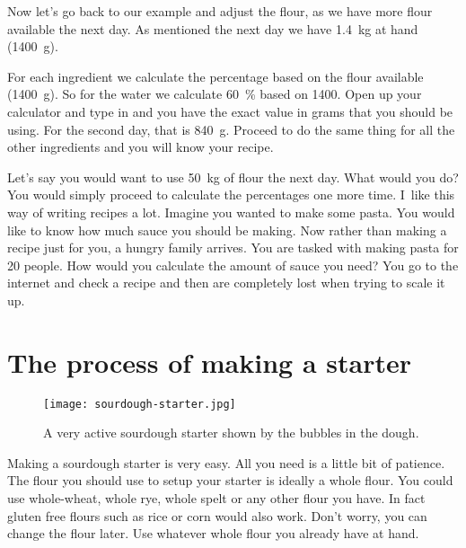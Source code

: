 Now let's go back to our example and adjust the flour, as we have
more flour available the next day. As mentioned the next day
we have \qty{1.4}{\kg} at hand (\qty{1400}{\gram}).

\begin{table}[!htb]
    \begin{center}
        
        \caption[Another baker's math example]{An example recipe that uses
            \qty{1400}{\gram} as its baseline and is then calculated using
            baker's math.}
    \end{center}
\end{table}

For each ingredient we calculate the percentage
based on the flour available (\qty{1400}{\gram}). So for the water
we calculate \qty{60}{\percent} based on \num{1400}. Open up your
calculator and type in  and you have
the exact value in grams that you should be using.
For the second day, that is \qty{840}{\gram}. Proceed to do the same
thing for all the other ingredients and you will know
your recipe.


Let's say you would want to use \qty{50}{\kg} of flour
the next day. What would you do? You would simply proceed
to calculate the percentages one more time. I~like this
way of writing recipes a lot. Imagine you wanted to make
some pasta. You would like to know how much sauce you should
be making. Now rather than making a recipe just for you, a
hungry family arrives. You are tasked with making pasta
for \num{20} people. How would you calculate the amount of sauce
you need? You go to the internet and check a recipe and then
are completely lost when trying to scale it up.

\section{The process of making a starter}

\begin{figure}[!htb]
  \texttt{[image: sourdough-starter.jpg]}
  \caption[Very active sourdough]{A very active sourdough starter shown by the
      bubbles in the dough.}%
  \label{fig:sourdough-starter}
\end{figure}

Making a sourdough starter is very easy. All you need
is a little bit of patience. The flour you should
use to setup your starter is ideally a whole flour.
You could use whole-wheat, whole rye, whole spelt or
any other flour you have. In fact gluten free flours such
as rice or corn would also work. Don't worry, you can
change the flour later. Use whatever whole flour you
already have at hand.


